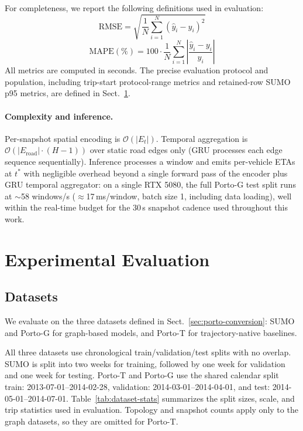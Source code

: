 \documentclass[pdflatex,sn-basic,Numbered]{sn-jnl}%
\begin{document}
For completeness, we report the following definitions used in evaluation:
\begin{equation}
\mathrm{RMSE} = \sqrt{\frac{1}{N}\sum_{i=1}^{N} (\hat{y}_i - y_i)^2}
\end{equation}
\begin{equation}
\mathrm{MAPE}(\%) = 100\cdot \frac{1}{N}\sum_{i=1}^{N} \left|\frac{\hat{y}_i - y_i}{y_i}\right|
\end{equation}
All metrics are computed in seconds. The precise evaluation protocol and population, including trip-start protocol-range metrics and retained-row SUMO p95 metrics, are defined in Sect.~\ref{sec4}.

\paragraph{Complexity and inference.}
Per-snapshot spatial encoding is $\mathcal{O}(|E_t|)$. Temporal aggregation is $\mathcal{O}(|E_\text{road}|\cdot(H{-}1))$ over static road edges only (GRU processes each edge sequence sequentially). Inference processes a window and emits per-vehicle ETAs at $t^*$ with negligible overhead beyond a single forward pass of the encoder plus GRU temporal aggregator: on a single RTX 5080, the full Porto-G test split runs at $\sim$58 windows/s ($\approx$17\,ms/window, batch size 1, including data loading), well within the real-time budget for the 30\,s snapshot cadence used throughout this work.





\section{Experimental Evaluation}\label{sec4}

\subsection{Datasets}\label{sec:porto-dataset}
We evaluate on the three datasets defined in Sect.~\ref{sec:porto-conversion}: SUMO and Porto-G for graph-based models, and Porto-T for trajectory-native baselines.

All three datasets use chronological train/validation/test splits with no overlap. SUMO is split into two weeks for training, followed by one week for validation and one week for testing. Porto-T and Porto-G use the shared calendar split train: 2013-07-01--2014-02-28, validation: 2014-03-01--2014-04-01, and test: 2014-05-01--2014-07-01. Table~\ref{tab:dataset-stats} summarizes the split sizes, scale, and trip statistics used in evaluation. Topology and snapshot counts apply only to the graph datasets, so they are omitted for Porto-T.
\end{document}
